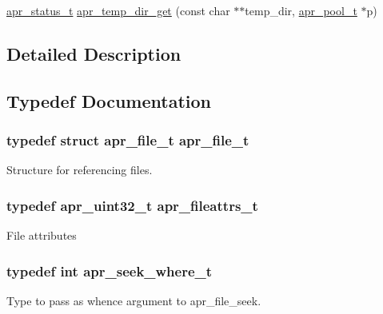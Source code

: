 \begin{DoxyCompactItemize}
\item 
\hyperlink{group__apr__errno_gaf76ee4543247e9fb3f3546203e590a6c}{apr\-\_\-status\-\_\-t} \hyperlink{group__apr__file__io_ga5cc19828a668c362be0ad7a12b805cc0}{apr\-\_\-temp\-\_\-dir\-\_\-get} (const char $\ast$$\ast$temp\-\_\-dir, \hyperlink{group__apr__pools_gaf137f28edcf9a086cd6bc36c20d7cdfb}{apr\-\_\-pool\-\_\-t} $\ast$p)
\end{DoxyCompactItemize}


\subsection{Detailed Description}


\subsection{Typedef Documentation}
\hypertarget{group__apr__file__io_gaa46e4763ac375ea3c7a43ba6f6099e22}{
\subsubsection[{apr\-\_\-file\-\_\-t}]{\setlength{\rightskip}{0pt plus 5cm}typedef struct {\bf apr\-\_\-file\-\_\-t} {\bf apr\-\_\-file\-\_\-t}}}\label{group__apr__file__io_gaa46e4763ac375ea3c7a43ba6f6099e22}
Structure for referencing files. \hypertarget{group__apr__file__io_ga11fbee5a7a3f3d45fff5c31df0db9737}{
\subsubsection[{apr\-\_\-fileattrs\-\_\-t}]{\setlength{\rightskip}{0pt plus 5cm}typedef apr\-\_\-uint32\-\_\-t {\bf apr\-\_\-fileattrs\-\_\-t}}}\label{group__apr__file__io_ga11fbee5a7a3f3d45fff5c31df0db9737}
File attributes \hypertarget{group__apr__file__io_ga8eecd44975906042e0e369771802a145}{
\subsubsection[{apr\-\_\-seek\-\_\-where\-\_\-t}]{\setlength{\rightskip}{0pt plus 5cm}typedef int {\bf apr\-\_\-seek\-\_\-where\-\_\-t}}}\label{group__apr__file__io_ga8eecd44975906042e0e369771802a145}
Type to pass as whence argument to apr\-\_\-file\-\_\-seek. 


